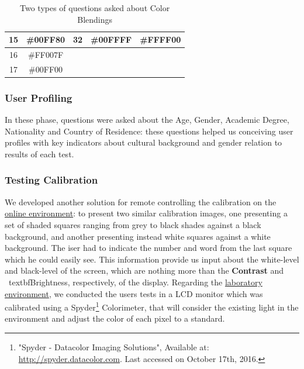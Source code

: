\begin{table}[htbp]
{\begin{tabular}{cc|ccc}
		\multicolumn{1}{c|}{15}       & \cellcolor[HTML]{00FF80}\#00FF80                        & \multicolumn{1}{c|}{32}       & \multicolumn{1}{c|}{\cellcolor[HTML]{00FFFF}\#00FFFF}                        & \multicolumn{1}{c|}{\cellcolor[HTML]{FFFF00}\#FFFF00}                        \\ \hline
		\multicolumn{1}{c|}{16}       & \cellcolor[HTML]{FF007F}\#FF007F                        & \multicolumn{3}{c}{}                                                                                                                                                                        \\ \cline{1-2}
		\multicolumn{1}{c|}{17}       & \cellcolor[HTML]{00FF00}\#00FF00                        & \multicolumn{3}{c}{\multirow{-2}{*}{}}                                                                                                                                                      \\ \cline{1-2}
	\end{tabular}}
  \vspace{+5pt}
  \caption{Two types of questions asked about Color Blendings}
  \label{table:color_blendings}
\end{table} \par
%
\subsubsection{User Profiling}
%
In these phase, questions were asked about the Age, Gender, Academic Degree, Nationality and Country of Residence:
these questions helped us conceiving user profiles with key indicators about cultural background and gender
relation to results of each test.%
%
\subsubsection{Testing Calibration}
%
We developed another solution for remote controlling the calibration on the \ul{online environment}: to present
two similar calibration images, one presenting a set of shaded squares ranging from grey to black shades against
a black background, and another presenting instead white squares against a white background. The iser had to
indicate the number and word from the last square which he could easily see. This information provide us input
about the white-level and black-level of the screen, which are nothing more than the \textbf{Contrast} and \
textbf{Brightness}, respectively, of the display. Regarding the \ul{laboratory environment}, we conducted the
users tests in a LCD monitor which was calibrated using a Spyder\footnote{"Spyder - Datacolor Imaging Solutions",
Available at: \url{http://spyder.datacolor.com}. Last accessed on October 17th, 2016.} Colorimeter, that will
consider the existing light in the environment and adjust the color of each pixel to a standard. \par
%
